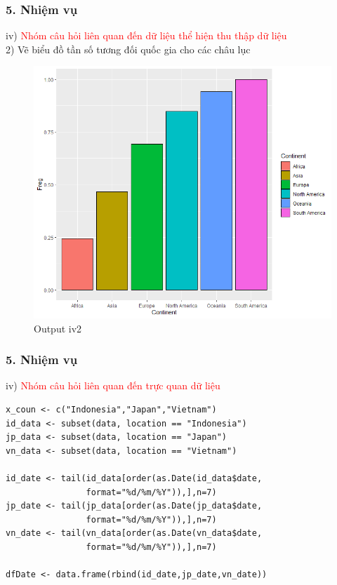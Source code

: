 \documentclass[english,10pt,table]{beamer}
\begin{document}
\begin{frame}[fragile]
\frametitle{5.  Nhiệm vụ}
	iv) \textcolor{red}{Nhóm câu hỏi liên quan đến dữ liệu thể hiện thu thập dữ liệu}\\%
    2) Vẽ biểu đồ tần số tương đối quốc gia cho các châu lục
	\begin{figure}[h!]
	\begin{center}
		    \includegraphics[scale = 0.4]{Images/IV/iv (2).png}
		     \caption{Output iv2}
		\end{center}
		\end{figure}
\end{frame}

\begin{frame}[fragile]
\frametitle{5.  Nhiệm vụ}
iv) \textcolor{red}{Nhóm câu hỏi liên quan đến trực quan dữ liệu}\\
 \lstset{
    title=Prep for iv3-4}
\begin{lstlisting}[frame=single]  
x_coun <- c("Indonesia","Japan","Vietnam")
id_data <- subset(data, location == "Indonesia")
jp_data <- subset(data, location == "Japan")
vn_data <- subset(data, location == "Vietnam")

id_date <- tail(id_data[order(as.Date(id_data$date,
                format="%d/%m/%Y")),],n=7)
jp_date <- tail(jp_data[order(as.Date(jp_data$date,
                format="%d/%m/%Y")),],n=7)
vn_date <- tail(vn_data[order(as.Date(vn_data$date,
                format="%d/%m/%Y")),],n=7)

dfDate <- data.frame(rbind(id_date,jp_date,vn_date))
\end{lstlisting}
\end{frame}
\end{document}
